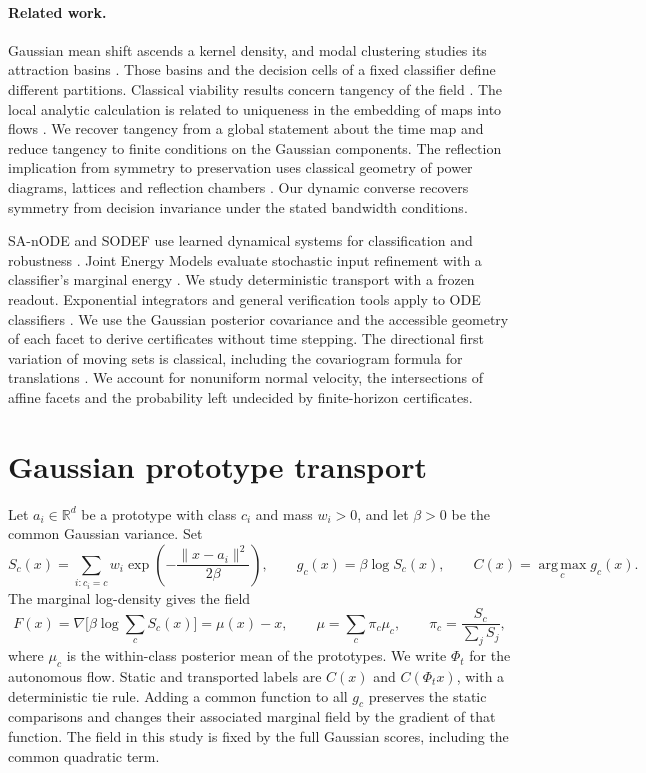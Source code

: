 \documentclass[10pt]{article}
\newcommand{\R}{\mathbb{R}}
\newcommand{\norm}[1]{\lVert #1\rVert}
\newcommand{\argmax}{\operatorname*{arg\,max}}
\begin{document}
\paragraph{Related work.}
Gaussian mean shift ascends a kernel density, and modal clustering
studies its attraction basins \cite{comaniciu,carreira,chacon,ghassabeh}.
Those basins and the decision cells of a fixed classifier define
different partitions. Classical viability results concern tangency of
the field \cite{nagumo,brezis}. The local analytic calculation is related
to uniqueness in the embedding of maps into flows \cite{zhang,ribon}.
We recover tangency from a global statement about the time map and
reduce tangency to finite conditions on the Gaussian components. The
reflection implication from symmetry to preservation uses classical
geometry of power diagrams, lattices and reflection chambers
\cite{aurenhammer,moody,ardila}. Our dynamic converse recovers symmetry
from decision invariance under the stated bandwidth conditions.

SA-nODE and SODEF use learned dynamical systems for classification and
robustness \cite{marino,kang}. Joint Energy Models evaluate stochastic
input refinement with a classifier's marginal energy \cite{jem}.
We study deterministic transport with a frozen readout. Exponential
integrators and general verification tools apply to ODE classifiers
\cite{cox,hochbruck,nnvode,neher}. We use the Gaussian posterior
covariance and the accessible geometry of each facet to derive
certificates without time stepping.
The directional first variation of moving sets is classical, including
the covariogram formula for translations \cite{galerne}. We account for
nonuniform normal velocity, the intersections of affine facets and the
probability left undecided by finite-horizon certificates.

\section{Gaussian prototype transport}
Let $a_i\in\R^d$ be a prototype with class $c_i$ and mass $w_i>0$, and let $\beta>0$ be the common Gaussian variance. Set
\[
 S_c(x)=\sum_{i:c_i=c}w_i\exp\!\left(-\frac{\norm{x-a_i}^2}{2\beta}\right),\qquad
 g_c(x)=\beta\log S_c(x),\qquad C(x)=\argmax_c g_c(x).
\]
The marginal log-density gives the field
\[
 F(x)=\nabla\big[\beta\log\sum_c S_c(x)\big]=\mu(x)-x,\qquad
 \mu=\sum_c \pi_c\mu_c,\qquad \pi_c=\frac{S_c}{\sum_j S_j},
\]
where $\mu_c$ is the within-class posterior mean of the prototypes. We write $\Phi_t$ for the autonomous flow. Static and transported labels are $C(x)$ and $C(\Phi_t x)$, with a deterministic tie rule. Adding a common function to all $g_c$ preserves the static comparisons and changes their associated marginal field by the gradient of that function. The field in this study is fixed by the full Gaussian scores, including the common quadratic term.
\end{document}
